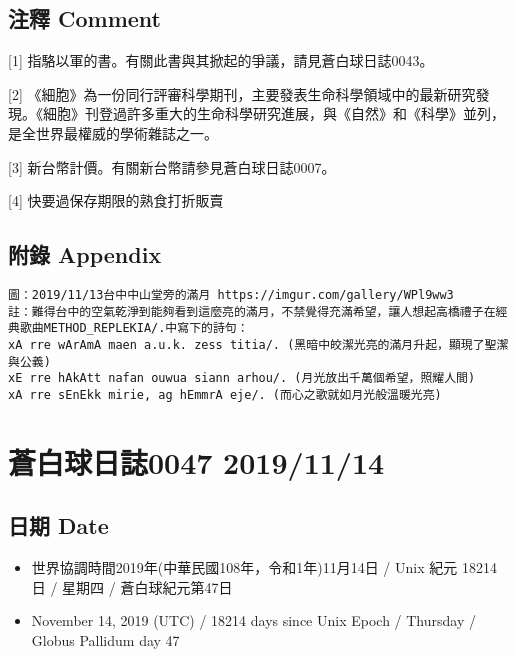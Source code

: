 \documentclass[
]{article}
\providecommand{\tightlist}{%
  \setlength{\itemsep}{0pt}\setlength{\parskip}{0pt}}
\begin{document}
\hypertarget{ux6ce8ux91cb-comment-12}{%
\subsection{注釋 Comment}\label{ux6ce8ux91cb-comment-12}}

{[}1{]} 指駱以軍的書。有關此書與其掀起的爭議，請見蒼白球日誌0043。

{[}2{]}
《細胞》為一份同行評審科學期刊，主要發表生命科學領域中的最新研究發現。《細胞》刊登過許多重大的生命科學研究進展，與《自然》和《科學》並列，是全世界最權威的學術雜誌之一。

{[}3{]} 新台幣計價。有關新台幣請參見蒼白球日誌0007。

{[}4{]} 快要過保存期限的熟食打折販賣

\hypertarget{ux9644ux9304-appendix-12}{%
\subsection{附錄 Appendix}\label{ux9644ux9304-appendix-12}}

\begin{verbatim}
圖：2019/11/13台中中山堂旁的滿月 https://imgur.com/gallery/WPl9ww3
註：難得台中的空氣乾淨到能夠看到這麼亮的滿月，不禁覺得充滿希望，讓人想起高橋禮子在經典歌曲METHOD_REPLEKIA/.中寫下的詩句：
xA rre wArAmA maen a.u.k. zess titia/. (黑暗中皎潔光亮的滿月升起，顯現了聖潔與公義)
xE rre hAkAtt nafan ouwua siann arhou/. (月光放出千萬個希望，照耀人間)
xA rre sEnEkk mirie, ag hEmmrA eje/. (而心之歌就如月光般溫暖光亮)
\end{verbatim}

\hypertarget{ux84bcux767dux7403ux65e5ux8a8c0047-20191114}{%
\section{蒼白球日誌0047
2019/11/14}\label{ux84bcux767dux7403ux65e5ux8a8c0047-20191114}}

\hypertarget{ux65e5ux671f-date-13}{%
\subsection{日期 Date}\label{ux65e5ux671f-date-13}}

\begin{itemize}
\tightlist
\item
  世界協調時間2019年(中華民國108年，令和1年)11月14日 / Unix 紀元 18214
  日 / 星期四 / 蒼白球紀元第47日
\item
  November 14, 2019 (UTC) / 18214 days since Unix Epoch / Thursday /
  Globus Pallidum day 47
\end{itemize}
\end{document}
